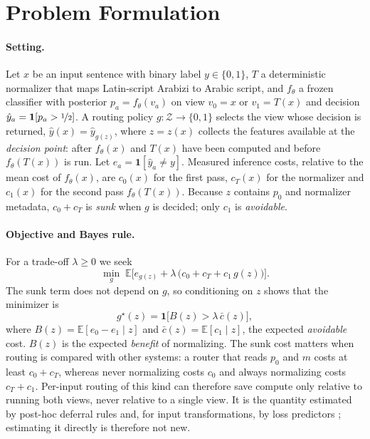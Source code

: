 \section{Problem Formulation}
\label{sec:formulation}

\paragraph{Setting.}
Let $x$ be an input sentence with binary label $y\in\{0,1\}$, $T$ a deterministic normalizer that maps Latin-script Arabizi to Arabic script, and $f_\theta$ a frozen classifier with posterior $p_a=f_\theta(v_a)$ on view $v_0=x$ or $v_1=T(x)$ and decision $\hat y_a=\mathbf 1[p_a>\nicefrac12]$.
A routing policy $g:\mathcal Z\to\{0,1\}$ selects the view whose decision is returned, $\hat y(x)=\hat y_{g(z)}$, where $z=z(x)$ collects the features available at the \emph{decision point}: after $f_\theta(x)$ and $T(x)$ have been computed and before $f_\theta(T(x))$ is run.
Let $e_a=\mathbf 1[\hat y_a\neq y]$. Measured inference costs, relative to the mean cost of $f_\theta(x)$, are $c_0(x)$ for the first pass, $c_T(x)$ for the normalizer and $c_1(x)$ for the second pass $f_\theta(T(x))$. Because $z$ contains $p_0$ and normalizer metadata, $c_0+c_T$ is \emph{sunk} when $g$ is decided; only $c_1$ is \emph{avoidable}.

\paragraph{Objective and Bayes rule.}
For a trade-off $\lambda\ge0$ we seek
\begin{equation}
\min_g\;\mathbb E\big[e_{g(z)}+\lambda\,\big(c_0+c_T+c_1\,g(z)\big)\big].
\label{eq:risk}
\end{equation}
The sunk term does not depend on $g$, so conditioning on $z$ shows that the minimizer is
\begin{equation}
g^\star(z)=\mathbf 1\big[B(z)>\lambda\,\bar c(z)\big],
\label{eq:bayes}
\end{equation}
where $B(z)=\mathbb E[e_0-e_1\mid z]$
and $\bar c(z)=\mathbb E[c_1\mid z]$, the expected \emph{avoidable} cost. $B(z)$ is the expected \emph{benefit} of normalizing. The sunk cost matters when routing is compared with other systems: a router that reads $p_0$ and $m$ costs at least $c_0+c_T$, whereas never normalizing costs $c_0$ and always normalizing costs $c_T+c_1$. Per-input routing of this kind can therefore save compute only relative to running both views, never relative to a single view. It is the quantity estimated by post-hoc deferral rules \citep{jitkrittum2023cascade} and, for input transformations, by loss predictors \citep{kim2020learningloss}; estimating it directly is therefore not new.

